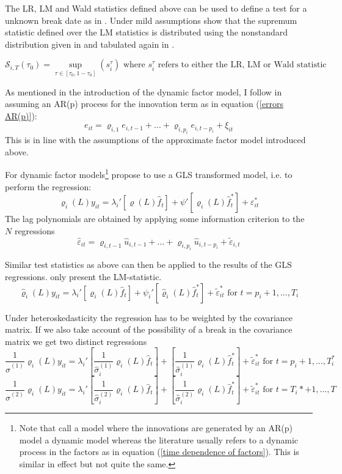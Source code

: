 \documentclass[11pt]{article}
\begin{document}
The LR, LM and Wald statistics defined above can be used to define a test for a unknown break date as in \citet{andrews1993tests}. Under mild assumptions \citet{breitung2011testing} show that the supremum statistic defined over the LM statistics is distributed using the nonstandard distribution given in \citet{andrews1993tests} and tabulated again in \citet{andrews2003tests}.

\begin{equation}
\label{sup LM statistic}
\mathscr{S}_{i,T}(\tau_0) = \sup_{\tau \in [\tau_0, 1-\tau_0]} (s_i^\tau) \text{ where $s_i^\tau$ refers to either the LR, LM or Wald statistic}
\end{equation}



As mentioned in the introduction of the dynamic factor model, I follow \citet{breitung2011testing} in assuming an AR(p) process for the innovation term as in equation (\ref{errors AR(p)}):
\begin{equation}
	\label{errors AR(p)}
	e_{it} = \varrho_{i, 1} e_{i, t-1} + ... + \varrho_{i, p_i} e_{i, t-p_i} + \xi_{it}
\end{equation}
This is in line with the assumptions of the approximate factor model introduced above.

For dynamic factor models\footnote{Note that \citet{breitung2011testing} call a model where the innovations are generated by an AR(p) model a dynamic model whereas the literature usually refers to a dynamic process in the factors as in equation (\ref{time dependence of factors}). This is similar in effect but not quite the same.} \citet{breitung2011testing} propose to use a GLS transformed model, i.e. to perform the regression:
$$\varrho_i(L) y_{it} = \lambda_i'[\varrho(L) \hat f_t] + \psi' [\varrho_i(L) \hat f_t^*] + \varepsilon^*_{it}$$
The lag polynomials are obtained by applying some information criterion to the $N$ regressions
$$\hat \varepsilon_{it} = \varrho_{i, t-1} \hat u_{i, t-1} + ... + \varrho_{i, p_i} \hat u_{i, t-p_i} + \tilde \varepsilon_{i,t}$$

Similar test statistics as above can then be applied to the results of the GLS regressions. \citet{breitung2011testing} only present the LM-statistic.
$$\hat \varrho_i(L) y_{it} = \lambda_i' \left[\varrho_i(L) \hat f_t\right] + \psi_i' \left[\hat \varrho_i(L) \hat f_t^*\right] + \tilde \varepsilon^*_{it} \text{ for } t= p_i+1, ..., T_i$$

Under heteroskedasticity the regression has to be weighted by the covariance matrix. If we also take account of the possibility of a break in the covariance matrix we get two distinct regressions
$$\frac{1}{\hat \sigma^{(1)}} \varrho_i(L) y_{it} = \lambda_i' \left[\frac{1}{\hat \sigma_i^{(1)}} \varrho_i(L) \hat f_t\right] + \left[\frac{1}{\hat \sigma_i^{(1)}} \varrho_i(L) \hat f_t^*\right] + \tilde \varepsilon^*_{it} \text{ for } t = p_i+1, ..., T^*_i$$
$$\frac{1}{\hat \sigma^{(2)}} \varrho_i(L) y_{it} = \lambda_i' \left[\frac{1}{\hat \sigma_i^{(2)}} \varrho_i(L) \hat f_t\right] + \left[\frac{1}{\hat \sigma_i^{(2)}} \varrho_i(L) \hat f_t^*\right] + \tilde \varepsilon^*_{it} \text{ for } t = T_i*+1, ..., T$$
\end{document}
